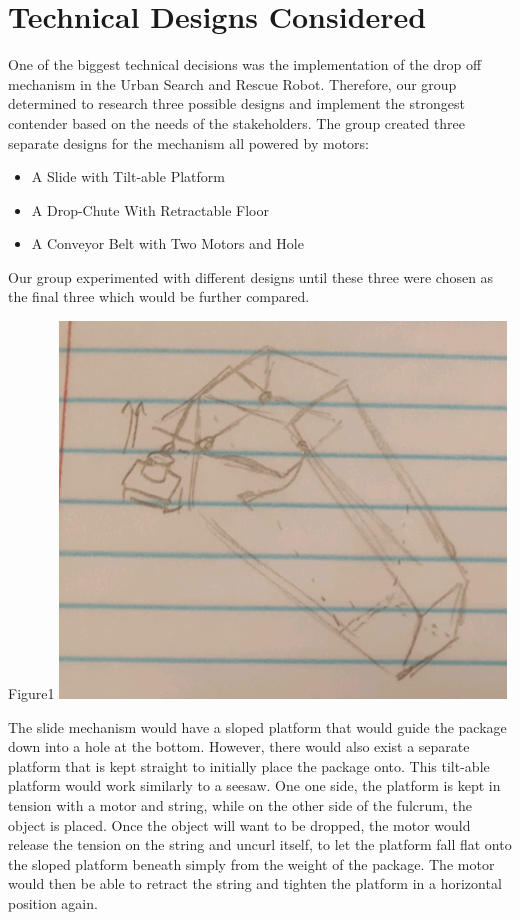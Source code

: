 \documentclass{article}
\begin{document}
\section{Technical Designs Considered}
    One of the biggest technical decisions was the implementation of the drop off mechanism in the Urban Search and Rescue Robot. Therefore, our group determined to research three possible designs and implement the strongest contender based on the needs of the stakeholders. The group created three separate designs for the mechanism all powered by motors:
    \begin{itemize}
    \item A Slide with Tilt-able Platform
    \item A Drop-Chute With Retractable Floor
    \item A Conveyor Belt with Two Motors and Hole
\end{itemize}
    
    Our group experimented with different designs until these three were chosen as the final three which would be further compared. 
    
    \begin{center}Figure1 {\includegraphics[height=10cm]{Slide.png}}\end{center}
    The slide mechanism would have a sloped platform that would guide the package down into a hole at the bottom. However, there would also exist a separate platform that is kept straight to initially place the package onto. This tilt-able platform would work similarly to a seesaw. One one side, the platform is kept in tension with a motor and string, while on the other side of the fulcrum, the object is placed. Once the object will want to be dropped, the motor would release the tension on the string and uncurl itself, to let the platform fall flat onto the sloped platform beneath simply from the weight of the package. The motor would then be able to retract the string and tighten the platform in a horizontal position again.
    
\end{document}
